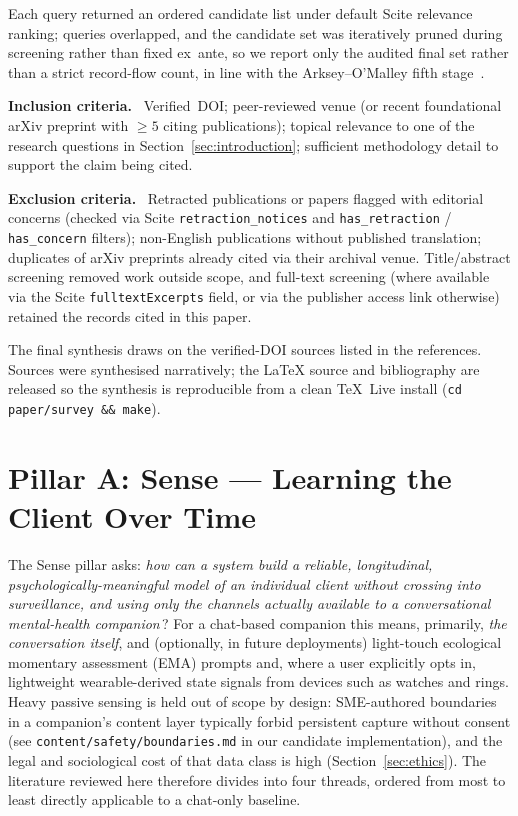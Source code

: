 \documentclass[10pt,conference]{article}
\newcommand{\secref}[1]{Section~\ref{#1}}
\renewcommand{\paragraph}[1]{\smallskip\par\noindent\textbf{#1}~\ignorespaces}
\begin{document}
Each query returned an ordered candidate list under default Scite
relevance ranking; queries overlapped, and the candidate set was
iteratively pruned during screening rather than fixed ex~ante, so we
report only the audited final set rather than a strict record-flow
count, in line with the Arksey--O'Malley
fifth stage~\cite{Arksey2005Scoping,Levac2010Scoping}.

\paragraph{Inclusion criteria.}
Verified~DOI; peer-reviewed venue (or recent foundational arXiv preprint
with $\geq\!5$ citing publications); topical relevance to one of the
research questions in \secref{sec:introduction}; sufficient methodology
detail to support the claim being cited.

\paragraph{Exclusion criteria.}
Retracted publications or papers flagged with editorial concerns
(checked via Scite \texttt{retraction\_notices} and
\texttt{has\_retraction} / \texttt{has\_concern} filters); non-English
publications without published translation; duplicates of arXiv
preprints already cited via their archival venue. Title/abstract
screening removed work outside scope, and full-text screening (where
available via the Scite \texttt{fulltextExcerpts} field, or via the
publisher access link otherwise) retained the records cited in this
paper.

The final synthesis draws on the verified-DOI sources listed in the
references. Sources were synthesised narratively; the LaTeX source
and bibliography are released so the synthesis is reproducible from a
clean TeX~Live install (\texttt{cd paper/survey \&\& make}).

\section{Pillar A: Sense --- Learning the Client Over Time}\label{sec:sense}

The Sense pillar asks: \emph{how can a system build a reliable,
longitudinal, psychologically-meaningful model of an individual client
without crossing into surveillance, and using only the channels actually
available to a conversational mental-health companion}\,? For a
chat-based companion this means, primarily, \emph{the conversation
itself}, and (optionally, in future deployments) light-touch
ecological momentary assessment (EMA) prompts and, where a user
explicitly opts in, lightweight wearable-derived state signals from
devices such as watches and rings. Heavy passive sensing is held out
of scope by design: SME-authored boundaries in a
companion's content layer typically forbid persistent capture without
consent (see \texttt{content/safety/boundaries.md} in our candidate
implementation), and the legal and sociological cost of that data
class is high (\secref{sec:ethics}). The literature reviewed here
therefore divides into four threads, ordered from most to least
directly applicable to a chat-only baseline.
\end{document}
